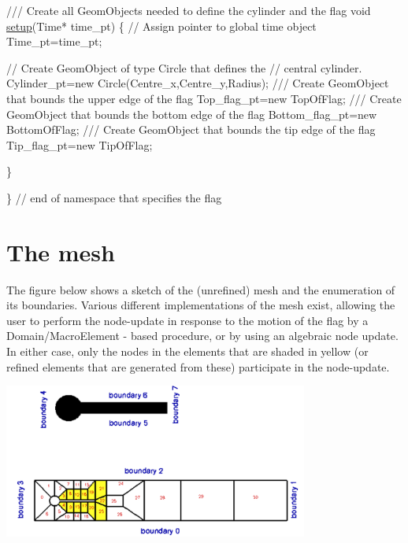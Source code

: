 \begin{DoxyCodeInclude}
\textcolor{comment}{}
\textcolor{comment}{ /// Create all GeomObjects needed to define the cylinder and the flag}
\textcolor{comment}{} \textcolor{keywordtype}{void} \hyperlink{namespaceFlag__definition_a61a03bffd4a34950ef9892be53c49f89}{setup}(Time* time\_pt)
 \{
  \textcolor{comment}{// Assign pointer to global time object}
  Time\_pt=time\_pt;
  
  \textcolor{comment}{// Create GeomObject of type Circle that defines the}
  \textcolor{comment}{// central cylinder.}
  Cylinder\_pt=\textcolor{keyword}{new} Circle(Centre\_x,Centre\_y,Radius);
  \textcolor{comment}{}
\textcolor{comment}{  /// Create GeomObject that bounds the upper edge of the flag}
\textcolor{comment}{}  Top\_flag\_pt=\textcolor{keyword}{new} TopOfFlag;
  \textcolor{comment}{}
\textcolor{comment}{  /// Create GeomObject that bounds the bottom edge of the flag}
\textcolor{comment}{}  Bottom\_flag\_pt=\textcolor{keyword}{new} BottomOfFlag;
  \textcolor{comment}{}
\textcolor{comment}{  /// Create GeomObject that bounds the tip edge of the flag}
\textcolor{comment}{}  Tip\_flag\_pt=\textcolor{keyword}{new} TipOfFlag;
 
 \}

\} \textcolor{comment}{// end of namespace that specifies the flag}

\end{DoxyCodeInclude}




 

\hypertarget{index_mesh}{}\section{The mesh}\label{index_mesh}
The figure below shows a sketch of the (unrefined) mesh and the enumeration of its boundaries. Various different implementations of the mesh exist, allowing the user to perform the node-\/update in response to the motion of the flag by a {\ttfamily Domain/\+Macro\+Element} -\/ based procedure, or by using an algebraic node update. In either case, only the nodes in the elements that are shaded in yellow (or refined elements that are generated from these) participate in the node-\/update.

 
\begin{DoxyImage}
\includegraphics[width=0.75\textwidth]{cylinder_with_flag_mesh}
\end{DoxyImage}


